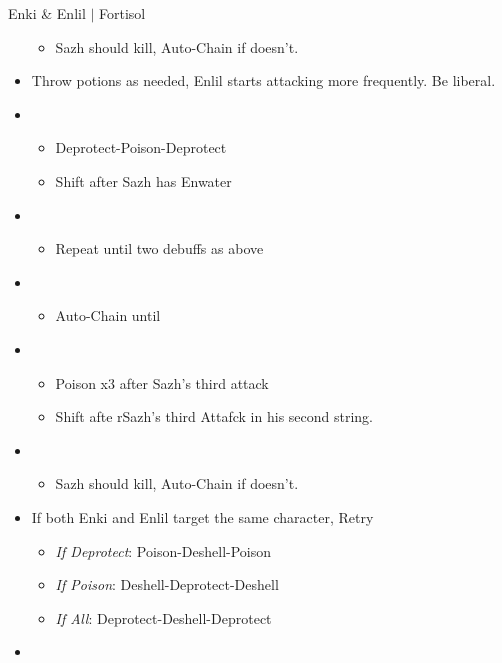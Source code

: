 \begin{battle}[1:41 $|$ 1:30]{Enki \& Enlil $|$ Fortisol}
\begin{multicols}{2}
\begin{itemize}
\begin{itemize}
				      \item Sazh should kill, Auto-Chain if doesn't.
			      \end{itemize}
			\item Throw potions as needed, Enlil starts attacking more frequently. Be liberal.
			\item \third
			      \begin{itemize}
				      \item Deprotect-Poison-Deprotect
				      \item Shift after Sazh has Enwater
			      \end{itemize}
			\item \fifth
			      \begin{itemize}
				      \item Repeat until two debuffs as above
			      \end{itemize}
			\item \fourth
			      \begin{itemize}
				      \item Auto-Chain until \stagger
			      \end{itemize}
			\item \sixth
			      \begin{itemize}
				      \item Poison x3 after Sazh's third attack
				      \item Shift afte rSazh's third Attafck in his second string.
			      \end{itemize}
			\item \first
			      \begin{itemize}
				      \item Sazh should kill, Auto-Chain if doesn't.
			      \end{itemize}
		\end{itemize}
		\columnbreak
		\begin{itemize}
			\item If both Enki and Enlil target the same character, Retry
			      \begin{itemize}
				      \item \textit{If Deprotect}: Poison-Deshell-Poison
				      \item \textit{If Poison}: Deshell-Deprotect-Deshell
				      \item \textit{If All}: Deprotect-Deshell-Deprotect
			      \end{itemize}
			\item \third
			      \begin{itemize}

\end{itemize}
\end{itemize}
\end{multicols}
\end{battle}
